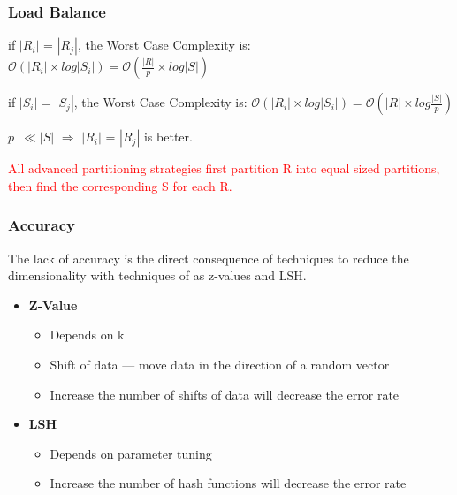 \begin{frame}
\frametitle{Load Balance}
\vspace{-0.1in}
\begin{block}{if $\left| R_i \right|$ = $\left| R_j \right|$, the Worst Case Complexity is:}
$\mathcal{O}\left(\left|R_i\right| \times log\left|S_i\right|\right) = \mathcal{O}\left(\frac{\left|R\right|}{p} \times log\left|S\right|\right)$
\end{block}
\vspace{-0.2in}
\begin{block}{if $\left| S_i \right|$ = $\left| S_j \right|$, the Worst Case Complexity is:}
$\mathcal{O}\left(\left|R_i\right| \times log\left|S_i\right|\right) = \mathcal{O}\left(\left|R\right|\times log\frac{\left|S\right|}{p}\right)$
\end{block}
\vspace{-0.2in}
$p$~$\ll \left|S\right|$ $\Rightarrow$ $\left| R_i \right|$ = $\left| R_j \right|$ is better.

\textcolor{red}{All advanced partitioning strategies first partition R into equal sized partitions, then find the corresponding S for each R.}
\end{frame}

\begin{frame}
\frametitle{Accuracy}
The lack of accuracy is the direct consequence of techniques to reduce the dimensionality with techniques of as z-values and LSH.
\begin{itemize}
\item \textbf{Z-Value}
\begin{itemize}
\item Depends on k
\item Shift of data --- move data in the direction of a random vector
\item Increase the number of shifts of data will decrease the error rate
\end{itemize}
\item \textbf{LSH}
\begin{itemize}
\item Depends on parameter tuning
\item Increase the number of hash functions will decrease the error rate
\end{itemize}
\end{itemize}
\end{frame}


